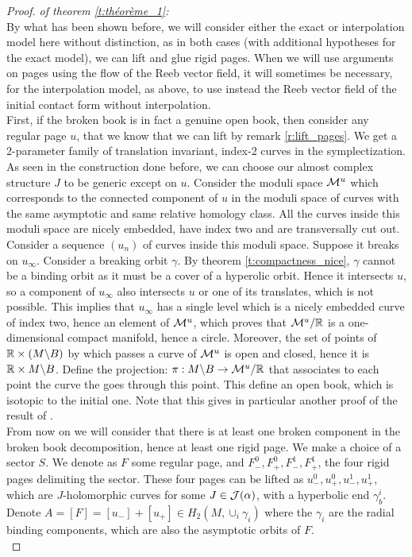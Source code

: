 \documentclass[../main.tex]{subfiles}
\begin{document}
\begin{proof}\textit{of theorem \ref{t:théorème_1}:\\}
By what has been shown before, we will consider either the exact or interpolation model here without distinction, as in both cases (with additional hypotheses for the exact model), we can lift and glue rigid pages. When we will use arguments on pages using the flow of the Reeb vector field, it will sometimes be necessary, for the interpolation model, as above, to use instead the Reeb vector field of the initial contact form without interpolation. \\

First, if the broken book is in fact a genuine open book, then consider any regular page $u$, that we know that we can lift by remark \ref{r:lift_pages}. We get a 2-parameter family of translation invariant, index-2 curves in the symplectization. As seen in the construction done before, we can choose our almost complex structure $J$ to be generic except on $u$. Consider the moduli space $\mathcal{M}^u$ which corresponds to the connected component of $u$ in the moduli space of curves with the same asymptotic and same relative homology class. All the curves inside this moduli space are nicely embedded, have index two and are transversally cut out. Consider a sequence $(u_n)$ of curves inside this moduli space. Suppose it breaks on $u_\infty$. Consider a breaking orbit $\gamma$. By theorem \ref{t:compactness_nice}, $\gamma$ cannot be a binding orbit as it must be a cover of a hyperolic orbit. Hence it intersects $u$, so a component of $u_\infty$ also intersects $u$ or one of its translates, which is not possible. This implies that $u_\infty$ has a single level which is a nicely embedded curve of index two, hence an element of $\mathcal{M}^u$, which proves that $\mathcal{M}^u/\mathbb{R}$ is a one-dimensional compact manifold, hence a circle. Moreover, the set of points of $\mathbb{R}\times (M\backslash B)$ by which passes a curve of $\mathcal{M}^u$ is open and closed, hence it is $\mathbb{R}\times M\backslash B$. Define the projection: $\pi : M\backslash B\rightarrow \mathcal{M}^u/\mathbb{R}$ that associates to each point the curve the goes through this point. This define an open book, which is isotopic to the initial one. Note that this gives in particular another proof of the result of \cite{wendl_open_2009}. \\

From now on we will consider that there is at least one broken component in the broken book decomposition, hence at least one rigid page. We make a choice of a sector $S$. We denote as $F$ some regular page, and $F_-^0, F_+^0,F_-^1,F_+^1$, the four rigid pages delimiting the sector. These four pages can be lifted as  $u_-^0, u_+^0,u_-^1,u_+^1$, which are $J$-holomorphic curves for some $J\in \mathcal{J}(\alpha)$, with a hyperbolic end $\gamma_b^i$. Denote $A = [F] = [u_-] + [u_+] \in H_2(M,\cup_i\gamma_i)$ where the $\gamma_i$ are the radial binding components, which are also the asymptotic orbits of $F$. \\
    

\end{proof}
\end{document}
